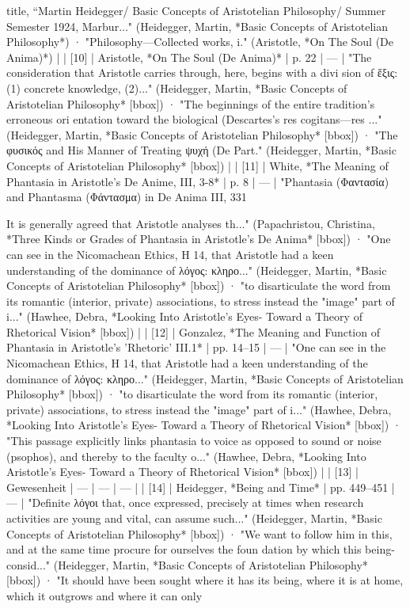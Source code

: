 title, “Martin Heidegger/ Basic Concepts of Aristotelian Philosophy/ Summer Semester 1924, Marbur..." (Heidegger, Martin, *Basic Concepts of Aristotelian Philosophy*) · "Philosophy—Collected works, i." (Aristotle, *On The Soul (De Anima)*) |
| [10] | Aristotle, *On The Soul (De Anima)* | p. 22 | — | "The consideration that Aristotle carries through, here, begins with a divi­ sion of ἕξις: (1) concrete knowledge, (2)..." (Heidegger, Martin, *Basic Concepts of Aristotelian Philosophy* [bbox]) · "The beginnings of the entire tradition’s erroneous ori­ entation toward the biological (Descartes’s res cogitans—res ..." (Heidegger, Martin, *Basic Concepts of Aristotelian Philosophy* [bbox]) · "The φυσικός and His Manner of Treating ψυχή (De Part." (Heidegger, Martin, *Basic Concepts of Aristotelian Philosophy* [bbox]) |
| [11] | White, *The Meaning of Phantasia in Aristotle's De Anime, III, 3-8* | p. 8 | — | "Phantasia (Φαντασία) and Phantasma (Φάντασμα) in De Anima III, 331

It is generally agreed that Aristotle analyses th..." (Papachristou, Christina, *Three Kinds or Grades of Phantasia in Aristotle's De Anima* [bbox]) · "One can see in the Nicomachean Ethics, Η 14, that Aristotle had a keen understanding of the dominance of λόγος: κληρο..." (Heidegger, Martin, *Basic Concepts of Aristotelian Philosophy* [bbox]) · "to disarticulate the word from its romantic (interior, private) associations, to stress instead the "image" part of i..." (Hawhee, Debra, *Looking Into Aristotle's Eyes- Toward a Theory of Rhetorical Vision* [bbox]) |
| [12] | Gonzalez, *The Meaning and Function of Phantasia in Aristotle's 'Rhetoric' III.1* | pp. 14–15 | — | "One can see in the Nicomachean Ethics, Η 14, that Aristotle had a keen understanding of the dominance of λόγος: κληρο..." (Heidegger, Martin, *Basic Concepts of Aristotelian Philosophy* [bbox]) · "to disarticulate the word from its romantic (interior, private) associations, to stress instead the "image" part of i..." (Hawhee, Debra, *Looking Into Aristotle's Eyes- Toward a Theory of Rhetorical Vision* [bbox]) · "This passage explicitly links phantasia to voice as opposed to sound or noise (psophos), and thereby to the faculty o..." (Hawhee, Debra, *Looking Into Aristotle's Eyes- Toward a Theory of Rhetorical Vision* [bbox]) |
| [13] | Gewesenheit | — | — | — |
| [14] | Heidegger, *Being and Time* | pp. 449–451 | — | "Definite λόγοι that, once expressed, precisely at times when research activities are young and vital, can assume such..." (Heidegger, Martin, *Basic Concepts of Aristotelian Philosophy* [bbox]) · "We want to follow him in this, and at the same time procure for ourselves the foun­ dation by which this being-consid..." (Heidegger, Martin, *Basic Concepts of Aristotelian Philosophy* [bbox]) · "It should have been sought where it has its being, where it is at home, which it outgrows and where it can only

